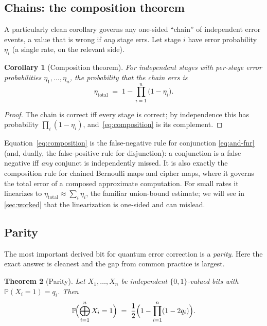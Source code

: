 \documentclass[a4paper,onecolumn,unpublished,nopdfoutputerror,allowtoday]{quantumarticle}
\numberwithin{equation}{section}
\theoremstyle{plain}
\newtheorem{theorem}{Theorem}[section]
\newtheorem{corollary}[theorem]{Corollary}
\theoremstyle{definition}
\theoremstyle{remark}
\newcommand{\Prob}{\mathbb{P}}
\newcommand{\bits}{\{0,1\}}
\newcommand{\bigxor}{\bigoplus}
\begin{document}
\subsection{Chains: the composition theorem}

A particularly clean corollary governs any one-sided ``chain'' of independent
error events, a value that is wrong if \emph{any} stage errs. Let stage $i$
have error probability $\eta_i$ (a single rate, on the relevant side).

\begin{corollary}[Composition theorem]
\label{cor:composition}
For independent stages with per-stage error probabilities $\eta_1,\dots,\eta_n$,
the probability that the chain errs is
\begin{equation}
\label{eq:composition}
  \eta_{\mathrm{total}} \;=\; 1 - \prod_{i=1}^{n}\bigl(1-\eta_i\bigr).
\end{equation}
\end{corollary}

\begin{proof}
The chain is correct iff every stage is correct; by independence this has
probability $\prod_i(1-\eta_i)$, and~\eqref{eq:composition} is its complement.
\end{proof}

Equation~\eqref{eq:composition} is the false-negative rule for conjunction
\eqref{eq:and-fnr} (and, dually, the false-positive rule for disjunction): a
conjunction is a false negative iff \emph{any} conjunct is independently missed.
It is also exactly the composition rule for chained Bernoulli maps and cipher
maps, where it governs the total error of a composed approximate computation. For
small rates it linearizes to $\eta_{\mathrm{total}}\approx\sum_i\eta_i$, the
familiar union-bound estimate; we will see in \cref{sec:worked} that the
linearization is one-sided and can mislead.

\subsection{Parity}

The most important derived bit for quantum error correction is a \emph{parity}.
Here the exact answer is cleanest and the gap from common practice is largest.

\begin{theorem}[Parity]
\label{thm:parity}
Let $X_1,\dots,X_n$ be independent $\bits$-valued bits with
$\Prob(X_i=1)=q_i$. Then
\begin{equation}
\label{eq:parity}
  \Prob\!\Bigl(\bigxor_{i=1}^{n} X_i = 1\Bigr)
  \;=\; \frac12\Bigl(1 - \prod_{i=1}^{n}(1-2q_i)\Bigr).
\end{equation}
\end{theorem}
\end{document}
